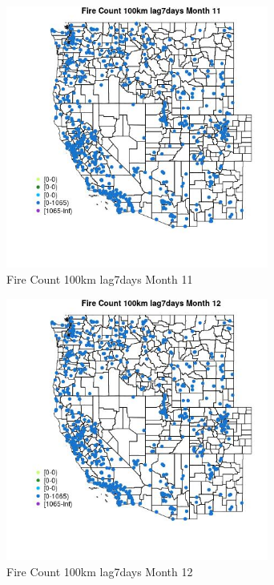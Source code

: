 \begin{figure} 
\centering  
\includegraphics[width=0.77\textwidth]{Code_Outputs/Report_ML_input_PM25_Step4_part_f_de_duplicated_aves_prioritize_24hr_obswNAs_MapObsMo11Fire_Count_100km_lag7days.jpg} 
\caption{\label{fig:Report_ML_input_PM25_Step4_part_f_de_duplicated_aves_prioritize_24hr_obswNAsMapObsMo11Fire_Count_100km_lag7days}Fire Count 100km lag7days Month 11} 
\end{figure} 
 

\begin{figure} 
\centering  
\includegraphics[width=0.77\textwidth]{Code_Outputs/Report_ML_input_PM25_Step4_part_f_de_duplicated_aves_prioritize_24hr_obswNAs_MapObsMo12Fire_Count_100km_lag7days.jpg} 
\caption{\label{fig:Report_ML_input_PM25_Step4_part_f_de_duplicated_aves_prioritize_24hr_obswNAsMapObsMo12Fire_Count_100km_lag7days}Fire Count 100km lag7days Month 12} 
\end{figure} 
 

